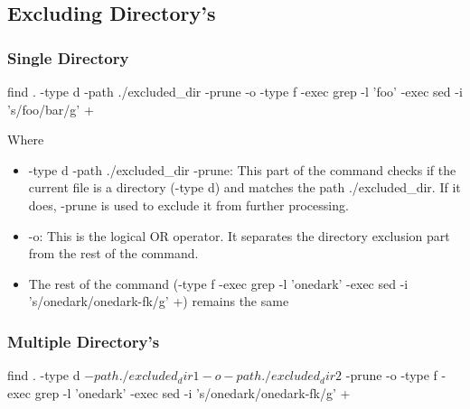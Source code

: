 \documentclass{report}
\begin{document}
    \bigbreak \noindent 
    \subsection{Excluding Directory's}
    \bigbreak \noindent 
    \subsubsection{Single Directory}
    \bigbreak \noindent 
    \begin{bashcode}
    find . -type d -path ./excluded_dir -prune -o -type f -exec grep -l 'foo' {} \; -exec sed -i 's/foo/bar/g' {} +
    \end{bashcode}
    \bigbreak \noindent 
    Where
    \bigbreak \noindent 
    \begin{itemize}
        \item -type d -path ./excluded\_dir -prune: This part of the command checks if the current file is a directory (-type d) and matches the path ./excluded\_dir. If it does, -prune is used to exclude it from further processing.
        \item -o: This is the logical OR operator. It separates the directory exclusion part from the rest of the command.
    \item The rest of the command (-type f -exec grep -l 'onedark' {} \; -exec sed -i 's/onedark/onedark-fk/g' {} +) remains the same
    \end{itemize}
    \pagebreak 
    \subsubsection{Multiple Directory's}
    \bigbreak \noindent 
    \begin{bashcode}
    find . -type d \( -path ./excluded_dir1 -o -path ./excluded_dir2 \) -prune -o -type f -exec grep -l 'onedark' {} \; -exec sed -i 's/onedark/onedark-fk/g' {} +
    \end{bashcode}
\end{document}
